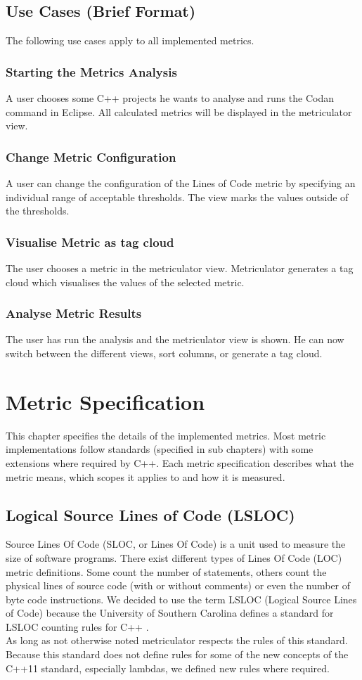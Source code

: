 \documentclass[11pt,a4paper,oneside]{scrreprt}
\begin{document}
\section{Use Cases (Brief Format)}
The following use cases apply to all implemented metrics.
\subsection{Starting the Metrics Analysis}
A user chooses some C++ projects he wants to analyse and runs the Codan command in Eclipse. All calculated metrics will be displayed in the metriculator view.
\subsection{Change Metric Configuration}
A user can change the configuration of the Lines of Code metric by specifying an individual range of acceptable thresholds. The view marks the values outside of the thresholds.
\subsection{Visualise Metric as tag cloud}
The user chooses a metric in the metriculator view. Metriculator generates a tag cloud which visualises the values of the selected metric.
\subsection{Analyse Metric Results}
The user has run the analysis and the metriculator view is shown. He can now switch between the different views, sort columns, or generate a tag cloud.

\chapter{Metric Specification}\label{metric-spec}
This chapter specifies the details of the implemented metrics. Most metric implementations follow standards (specified in sub chapters) with some extensions where required by C++. Each metric specification describes what the metric means, which scopes it applies to and how it is measured.

\section{Logical Source Lines of Code (LSLOC)}\label{lsloc}
Source Lines Of Code (SLOC, or Lines Of Code) \cite{lsloc_def} is a unit used to measure the size of software programs. There exist different types of Lines Of Code (LOC) metric definitions. Some count the number of statements, others count the physical lines of source code (with or without comments) or even the number of byte code instructions. We decided to use the term LSLOC (Logical Source Lines of Code) because the University of Southern Carolina defines a standard for LSLOC counting rules for C++ \cite{lsloc_def}.\\
As long as not otherwise noted metriculator respects the rules of this standard. Because this standard does not define rules for some of the new concepts of the C++11 \cite{cpp_11_std} standard, especially lambdas, we defined new rules where required.
\end{document}
